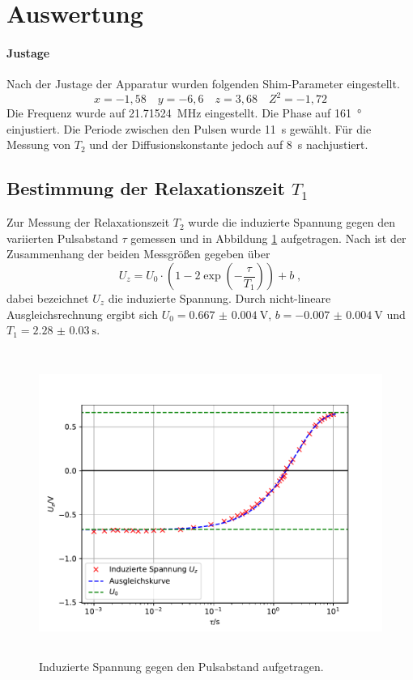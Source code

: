 \section{Auswertung}
\label{sec:Auswertung}
\paragraph{Justage}
Nach der Justage der Apparatur wurden folgenden Shim-Parameter eingestellt.
\begin{equation*}
x = -1,58 \quad y = -6,6 \quad z = 3,68 \quad Z^2 = -1,72
\end{equation*}
Die Frequenz wurde auf \SI{21,71524}{\mega\Hz} eingestellt. Die Phase auf
\SI{161}{\degree} einjustiert. Die Periode zwischen den Pulsen wurde
\SI{11}{\second} gewählt. Für die Messung von $T_2$ und der Diffusionskonstante
jedoch auf \SI{8}{\second} nachjustiert.

\subsection{Bestimmung der Relaxationszeit \texorpdfstring{$T_1$}{math}}
Zur Messung der Relaxationszeit $T_2$ wurde die induzierte Spannung gegen den variierten
Pulsabstand $\tau$ gemessen und in Abbildung \ref{fig:T1} aufgetragen. Nach \cite{Anleitung}
ist der Zusammenhang der beiden Messgrößen gegeben über
\begin{equation}
U_z = U_0 \cdot \left( 1-2\exp \left( -\frac{\tau}{T_1} \right) \right) + b	\; ,
\end{equation}
dabei bezeichnet $U_z$ die induzierte Spannung. Durch nicht-lineare Ausgleichsrechnung
ergibt sich $U_0 = \SI{0.667(4)}{\volt}$, $b = \SI{-0.007(4)}{\volt}$ und $T_1 = \SI{2.28(3)}{\second}$.
\begin{figure}
  \centering
  \includegraphics[height = 10cm]{plots/T1plot.pdf}
  \caption{Induzierte Spannung gegen den Pulsabstand aufgetragen.}
  \label{fig:T1}
\end{figure}
\FloatBarrier

